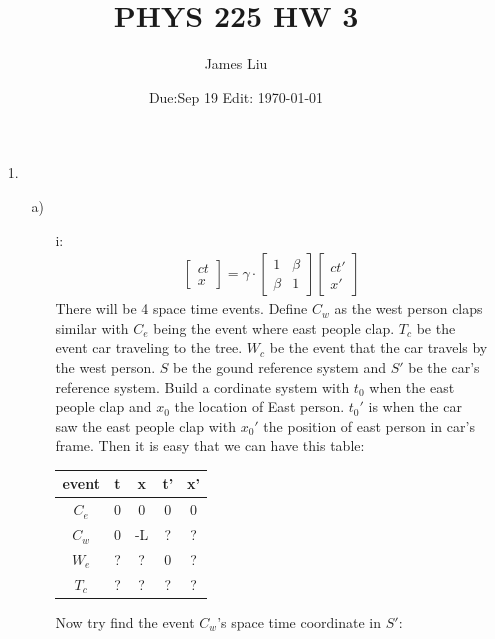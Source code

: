 \documentclass{article}
\date{Due:Sep 19 Edit: \today}
\title{PHYS 225 HW 3}
\author{James Liu}
\begin{document}
\maketitle
\begin{itemize}
    \item [1.]
    \begin{itemize}
        \item [a)]
        \begin{itemize}
            \item [i:]
            \begin{align*}
                \begin{bmatrix}
                    ct\\
                    x
                \end{bmatrix}
                =\gamma\cdot\begin{bmatrix}
                     1&\beta\\\beta & 1
                \end{bmatrix}\begin{bmatrix}
                    ct'\\ x'
                \end{bmatrix}
            \end{align*}
            There will be 4 space time events. Define \(C_w\) as the west person claps similar with \(C_e\) being the event where east people clap.
            \(T_c\) be the event car traveling to the tree. \(W_c\) be the event that the car travels by the west person. \(S\) be the gound reference system and \(S'\) be the car's reference system.
            Build a cordinate system with \(t_0\) when the east people clap and \(x_0\) the location of East person. \(t_0'\) is when the car saw the east people clap with \(x_0'\) the position of east person in car's frame.
            Then it is easy that we can have this table:
            \begin{center}
                \begin{tabular}{ c c c c c}
                event & t & x & t' &x'\\ \hline
                \(C_e\) & 0&0&0&0 \\  
                \(C_w\) & 0&-L&?&? \\
                \(W_e\) &?&?&0&?\\
                \(T_c\) &?&?&?&?
                \end{tabular}
            \end{center}
            Now try find the event \(C_w\)'s space time coordinate in \(S'\):

\end{itemize}
\end{itemize}
\end{itemize}
\end{document}

